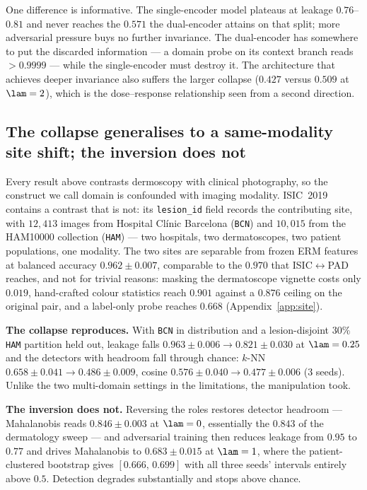 One difference is informative. The single-encoder model plateaus at leakage
$0.76$--$0.81$ and never reaches the $0.571$ the dual-encoder attains on that split;
more adversarial
pressure buys no further invariance. The dual-encoder has somewhere to put the
discarded information --- a domain probe on its context branch reads $>0.9999$ --- while
the single-encoder must destroy it. The architecture that achieves deeper invariance
also suffers the larger collapse ($0.427$ versus $0.509$ at $\lam = 2$), which is the
dose--response relationship seen from a second direction.

\subsection{The collapse generalises to a same-modality site shift; the inversion does not}
\label{sec:site}

Every result above contrasts dermoscopy with clinical photography, so the construct we
call domain is confounded with imaging modality. ISIC~2019 contains a contrast that is
not: its \texttt{lesion\_id} field records the contributing site, with $12{,}413$ images
from Hospital Cl\'inic Barcelona (\texttt{BCN}) and $10{,}015$ from the HAM10000
collection (\texttt{HAM}) --- two hospitals, two dermatoscopes, two patient
populations, one modality. The two sites are separable from frozen ERM features at
balanced accuracy $0.962 \pm 0.007$, comparable to the $0.970$ that
ISIC$\leftrightarrow$PAD reaches, and not for trivial reasons: masking the
dermatoscope vignette costs only $0.019$, hand-crafted colour statistics reach
$0.901$ against a $0.876$ ceiling on the original pair, and a label-only probe
reaches $0.668$ (Appendix~\ref{app:site}).

\textbf{The collapse reproduces.} With \texttt{BCN} in distribution and a
lesion-disjoint $30\%$ \texttt{HAM} partition held out, leakage falls
$0.963 \pm 0.006 \to 0.821 \pm 0.030$ at $\lam = 0.25$ and the detectors with
headroom fall through chance: $k$-NN $0.658 \pm 0.041 \to 0.486 \pm 0.009$, cosine
$0.576 \pm 0.040 \to 0.477 \pm 0.006$ (3 seeds). Unlike the two multi-domain settings
in the limitations, the manipulation took.

\textbf{The inversion does not.} Reversing the roles restores detector headroom ---
Mahalanobis reads $0.846 \pm 0.003$ at $\lam = 0$, essentially the $0.843$ of the
dermatology sweep --- and adversarial training then reduces leakage from $0.95$ to
$0.77$ and drives Mahalanobis to $0.683 \pm 0.015$ at $\lam = 1$, where the
patient-clustered bootstrap gives $[0.666,\, 0.699]$ with all three seeds' intervals
entirely above $0.5$. Detection degrades substantially and stops above chance.

